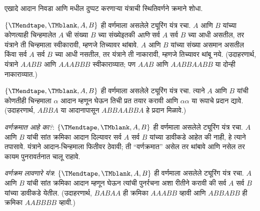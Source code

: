 \documentclass[../../../include/open-logic-section]{subfiles}
\begin{document}
\begin{prob}
एखादे आदान निवडा आणि  मधील दुप्पट
करणाऱ्या यंत्राची स्थितिवर्णने क्रमाने शोधा.
\end{prob}

\begin{prob}
$\{\TMendtape,\TMblank, A, B\}$ ही वर्णमाला असलेले ट्यूरिंग यंत्र
रचा. $A$ आणि $B$ यांच्या कोणत्याही चिन्हमालेत $A$ ची संख्या $B$
च्या संख्येइतकी \emph{आणि} सर्व $A$ सर्व $B$ च्या आधी असतील,
तर यंत्राने ती चिन्हमाला स्वीकारावी, म्हणजे तिच्यावर थांबावे.
$A$ आणि $B$ यांच्या संख्या असमान असतील किंवा सर्व $A$ सर्व $B$
च्या आधी नसतील, तर यंत्राने ती नाकारावी, म्हणजे तिच्यावर थांबू नये.
(उदाहरणार्थ, यंत्राने $AABB$ आणि $AAABBB$ स्वीकाराव्यात; पण
$AAB$ आणि $AABBAABB$ या दोन्ही नाकाराव्यात.)
\end{prob}

\begin{prob}
$\{\TMendtape,\TMblank, A, B\}$ ही वर्णमाला असलेले ट्यूरिंग यंत्र
रचा. त्याने $A$ आणि $B$ यांची कोणतीही चिन्हमाला $\alpha$ आदान
म्हणून घेऊन तिची प्रत तयार करावी आणि $\alpha\alpha$ या रूपाचे
प्रदान द्यावे. (उदाहरणार्थ, $ABBA$ या आदानापासून $ABBAABBA$
हे प्रदान मिळावे.)
\end{prob}

\begin{prob}
\emph{वर्णक्रमात आहे का?}: $\{\TMendtape,\TMblank, A, B\}$ ही
वर्णमाला असलेले ट्यूरिंग यंत्र रचा. $A$ आणि $B$ यांची सांत
क्रमिका आदान दिल्यावर सर्व $A$ सर्व $B$ यांच्या डावीकडे आहेत की
नाही, हे त्याने तपासावे. यंत्राने आदान-चिन्हमाला फितीवर ठेवावी;
ती ``वर्णक्रमात'' असेल तर थांबावे आणि नसेल तर कायम पुनरावर्तनात
चालू राहावे.
\end{prob}

\begin{prob}
\emph{वर्णक्रम लावणारे यंत्र}: $\{\TMendtape,\TMblank, A, B\}$
ही वर्णमाला असलेले ट्यूरिंग यंत्र रचा. $A$ आणि $B$ यांची सांत
क्रमिका आदान म्हणून घेऊन त्यांची पुनर्रचना अशा रीतीने करावी की
सर्व $A$ सर्व $B$ यांच्या डावीकडे येतील. (उदाहरणार्थ, $BABAA$
ही क्रमिका $AAABB$ व्हावी आणि $ABBABB$ ही क्रमिका $AABBBB$
व्हावी.)
\end{prob}
\end{document}
